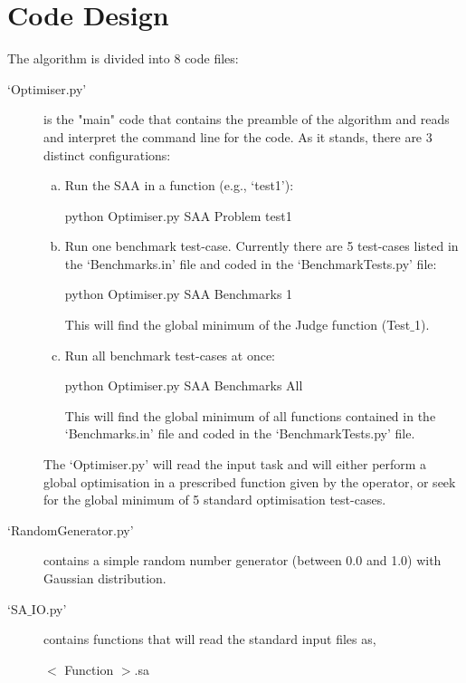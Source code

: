 \documentclass[14pt,twoside]{article}
\begin{document}
\section{Code Design}
   The algorithm is divided into 8 code files:
   \begin{description}
      \item[`Optimiser.py'] is the "main" code that contains the preamble of the algorithm and reads and interpret the command line for the code. As it stands, there are 3 distinct configurations:
          \begin{enumerate}[a)]
             \item Run the SAA in a function (e.g., `test1'): 
                \begin{center}
                    python Optimiser.py SAA Problem test1
                \end{center}
             \item Run one benchmark test-case. Currently there are 5 test-cases listed in the `Benchmarks.in' file and coded in the `BenchmarkTests.py' file:
                \begin{center}
                    python Optimiser.py SAA Benchmarks 1
                \end{center}
                This will find the global minimum of the Judge function (Test$\_$1).
             \item Run all benchmark test-cases at once:
                \begin{center}
                    python Optimiser.py SAA Benchmarks All
                \end{center}
                This will find the global minimum of all functions contained in the `Benchmarks.in' file and coded in the `BenchmarkTests.py' file.
          \end{enumerate}
          The `Optimiser.py' will read the input task and will either perform a global optimisation in a prescribed function given by the operator, or seek for the global minimum of 5 standard optimisation test-cases.

      \item[`RandomGenerator.py'] contains a simple random number generator (between 0.0 and 1.0) with Gaussian distribution.

      \item[`SA$\_$IO.py'] contains functions that will read the standard input files as,
                \begin{center}
                    $<$ Function $>$.sa
                \end{center}


\end{description}
\end{document}
